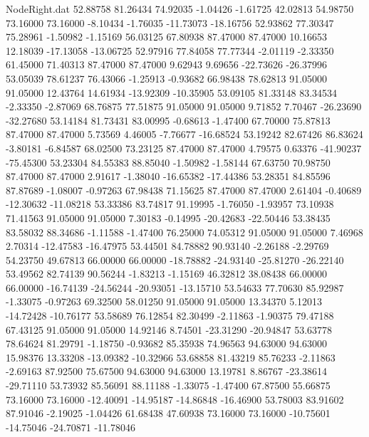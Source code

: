 \begin{filecontents}{NodeRight.dat}
  52.88758   81.26434   74.92035    -1.04426   -1.61725   42.02813   54.98750   73.16000   73.16000   -8.10434   -1.76035  -11.73073  -18.16756
  52.93862   77.30347   75.28961    -1.50982   -1.15169   56.03125   67.80938   87.47000   87.47000   10.16653   12.18039  -17.13058  -13.06725
  52.97916   77.84058   77.77344    -2.01119   -2.33350   61.45000   71.40313   87.47000   87.47000    9.62943    9.69656  -22.73626  -26.37996
  53.05039   78.61237   76.43066    -1.25913   -0.93682   66.98438   78.62813   91.05000   91.05000   12.43764   14.61934  -13.92309  -10.35905
  53.09105   81.33148   83.34534    -2.33350   -2.87069   68.76875   77.51875   91.05000   91.05000    9.71852    7.70467  -26.23690  -32.27680
  53.14184   81.73431   83.00995    -0.68613   -1.47400   67.70000   75.87813   87.47000   87.47000    5.73569    4.46005   -7.76677  -16.68524
  53.19242   82.67426   86.83624    -3.80181   -6.84587   68.02500   73.23125   87.47000   87.47000    4.79575    0.63376  -41.90237  -75.45300
  53.23304   84.55383   88.85040    -1.50982   -1.58144   67.63750   70.98750   87.47000   87.47000    2.91617   -1.38040  -16.65382  -17.44386
  53.28351   84.85596   87.87689    -1.08007   -0.97263   67.98438   71.15625   87.47000   87.47000    2.61404   -0.40689  -12.30632  -11.08218
  53.33386   83.74817   91.19995    -1.76050   -1.93957   73.10938   71.41563   91.05000   91.05000    7.30183   -0.14995  -20.42683  -22.50446
  53.38435   83.58032   88.34686    -1.11588   -1.47400   76.25000   74.05312   91.05000   91.05000    7.46968    2.70314  -12.47583  -16.47975
  53.44501   84.78882   90.93140    -2.26188   -2.29769   54.23750   49.67813   66.00000   66.00000  -18.78882  -24.93140  -25.81270  -26.22140
  53.49562   82.74139   90.56244    -1.83213   -1.15169   46.32812   38.08438   66.00000   66.00000  -16.74139  -24.56244  -20.93051  -13.15710
  53.54633   77.70630   85.92987    -1.33075   -0.97263   69.32500   58.01250   91.05000   91.05000   13.34370    5.12013  -14.72428  -10.76177
  53.58689   76.12854   82.30499    -2.11863   -1.90375   79.47188   67.43125   91.05000   91.05000   14.92146    8.74501  -23.31290  -20.94847
  53.63778   78.64624   81.29791    -1.18750   -0.93682   85.35938   74.96563   94.63000   94.63000   15.98376   13.33208  -13.09382  -10.32966
  53.68858   81.43219   85.76233    -2.11863   -2.69163   87.92500   75.67500   94.63000   94.63000   13.19781    8.86767  -23.38614  -29.71110
  53.73932   85.56091   88.11188    -1.33075   -1.47400   67.87500   55.66875   73.16000   73.16000  -12.40091  -14.95187  -14.86848  -16.46900
  53.78003   83.91602   87.91046    -2.19025   -1.04426   61.68438   47.60938   73.16000   73.16000  -10.75601  -14.75046  -24.70871  -11.78046

\end{filecontents}
